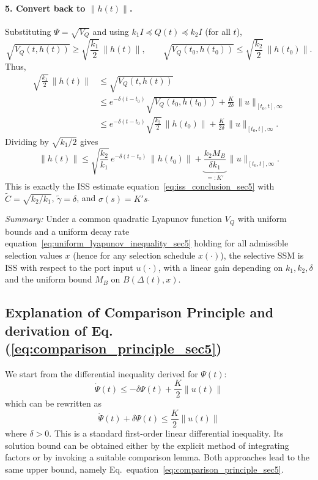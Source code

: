 \documentclass[10pt]{article} %
\def\eqref#1{equation~\ref{#1}}
\theoremstyle{definition}
\begin{document}
\paragraph{5. Convert back to $\|h(t)\|$.}
Substituting $\Psi=\sqrt{V_Q}$ and using $k_1 I \preceq Q(t) \preceq k_2 I$ (for all $t$),
\[
\sqrt{V_Q(t,h(t))} \ge \sqrt{\frac{k_1}{2}}\,\|h(t)\|,
\qquad
\sqrt{V_Q(t_0,h(t_0))} \le \sqrt{\frac{k_2}{2}}\,\|h(t_0)\|.
\]
Thus,
\begin{align*}
\sqrt{\frac{k_1}{2}}\,\|h(t)\|
&\le \sqrt{V_Q(t,h(t))} \\
&\le e^{-\delta(t-t_0)}\sqrt{V_Q(t_0,h(t_0))}
    + \frac{K}{2\delta}\, \|u\|_{[t_0,t],\infty} \\
&\le e^{-\delta(t-t_0)}\sqrt{\frac{k_2}{2}}\,\|h(t_0)\|
    + \frac{K}{2\delta}\, \|u\|_{[t_0,t],\infty}.
\end{align*}
Dividing by $\sqrt{k_1/2}$ gives
\begin{equation}
\|h(t)\|
\le
\sqrt{\frac{k_2}{k_1}}\, e^{-\delta(t-t_0)}\,\|h(t_0)\|
+
\underbrace{\frac{k_2 M_B}{\delta k_1}}_{=:K'}\, \|u\|_{[t_0,t],\infty}.
\end{equation}
This is exactly the ISS estimate \eqref{eq:iss_conclusion_sec5} with
$\tilde{C}=\sqrt{k_2/k_1}$, $\tilde{\gamma}=\delta$, and $\sigma(s)=K's$.

\textit{Summary:} Under a common quadratic Lyapunov function $V_Q$ with uniform bounds and a uniform decay rate
\eqref{eq:uniform_lyapunov_inequality_sec5} holding for all admissible selection values $x$ (hence for any selection schedule $x(\cdot)$),
the selective SSM is ISS with respect to the port input $u(\cdot)$, with a linear gain depending on
$k_1,k_2,\delta$ and the uniform bound $M_B$ on $B(\Delta(t),x)$.

\subsection{Explanation of Comparison Principle and derivation of Eq. (\ref{eq:comparison_principle_sec5})}
\label{subsec:explanation_of_comparison_principle_and_derivation}
We start from the differential inequality derived for $\Psi(t)$:
\begin{equation} \label{eq:psi_dot_ineq}
\dot{\Psi}(t) \le -\delta \Psi(t) + \frac{K}{2} \|u(t)\|
\end{equation}
which can be rewritten as
\begin{equation} \label{eq:psi_dot_rearranged}
\dot{\Psi}(t) + \delta \Psi(t) \le \frac{K}{2} \|u(t)\|
\end{equation}
where $\delta > 0$.
This is a standard first-order linear differential inequality. Its solution bound can be obtained either by the explicit method of integrating factors or by invoking a suitable comparison lemma. Both approaches lead to the same upper bound, namely Eq.~\eqref{eq:comparison_principle_sec5}.
\end{document}

